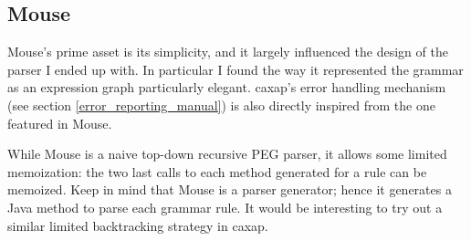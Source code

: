 \subsection{Mouse}

Mouse's prime asset is its simplicity, and it largely influenced the design of
the parser I ended up with. In particular I found the way it represented the
grammar as an expression graph particularly elegant. caxap's error handling
mechanism (see section \ref{error_reporting_manual}) is also directly inspired
from the one featured in Mouse.

While Mouse is a naive top-down recursive PEG parser, it allows some limited
memoization: the two last calls to each method generated for a rule can be
memoized. Keep in mind that Mouse is a parser generator; hence it generates a
Java method to parse each grammar rule. It would be interesting to try out a
similar limited backtracking strategy in caxap.
